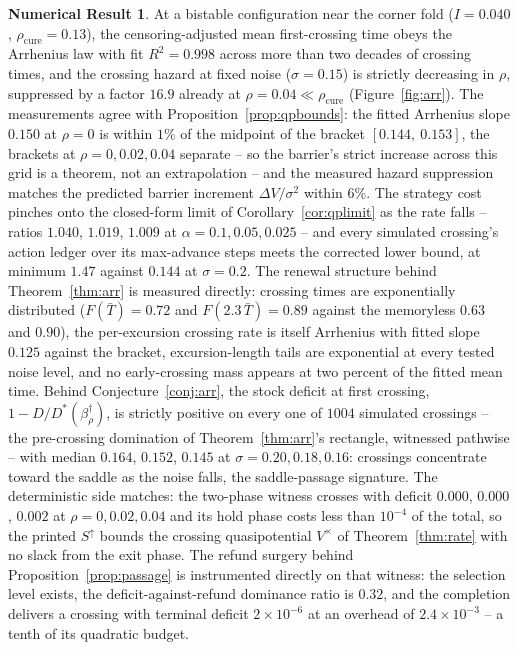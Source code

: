 \documentclass[11pt]{article}
\theoremstyle{definition}
\newtheorem{numresult}[theorem]{Numerical Result}
\theoremstyle{remark}
\numberwithin{equation}{section}
\begin{document}
\begin{numresult}\label{nr:arr}
At a bistable configuration near the corner fold ($I = 0.040$, $\rho_{\mathrm{cure}} = 0.13$), the censoring-adjusted mean first-crossing time obeys the Arrhenius law with fit $R^2 = 0.998$ across more than two decades of crossing times, and the crossing hazard at fixed noise ($\sigma = 0.15$) is strictly decreasing in $\rho$, suppressed by a factor $16.9$ already at $\rho = 0.04 \ll \rho_{\mathrm{cure}}$ (Figure~\ref{fig:arr}). The measurements agree with Proposition~\ref{prop:qpbounds}: the fitted Arrhenius slope $0.150$ at $\rho = 0$ is within $1\%$ of the midpoint of the bracket $[0.144,\ 0.153]$, the brackets at $\rho = 0, 0.02, 0.04$ separate -- so the barrier's strict increase across this grid is a theorem, not an extrapolation -- and the measured hazard suppression matches the predicted barrier increment $\Delta V/\sigma^2$ within $6\%$. The strategy cost pinches onto the closed-form limit of Corollary~\ref{cor:qplimit} as the rate falls -- ratios $1.040$, $1.019$, $1.009$ at $\alpha = 0.1, 0.05, 0.025$ -- and every simulated crossing's action ledger over its max-advance steps meets the corrected lower bound, at minimum $1.47$ against $0.144$ at $\sigma = 0.2$. The renewal structure behind Theorem~\ref{thm:arr} is measured directly: crossing times are exponentially distributed ($F(\bar T) = 0.72$ and $F(2.3\,\bar T) = 0.89$ against the memoryless $0.63$ and $0.90$), the per-excursion crossing rate is itself Arrhenius with fitted slope $0.125$ against the bracket, excursion-length tails are exponential at every tested noise level, and no early-crossing mass appears at two percent of the fitted mean time. Behind Conjecture~\ref{conj:arr}, the stock deficit at first crossing, $1 - D/D^\ast(\beta^\dagger_\rho)$, is strictly positive on every one of $1004$ simulated crossings -- the pre-crossing domination of Theorem~\ref{thm:arr}'s rectangle, witnessed pathwise -- with median $0.164$, $0.152$, $0.145$ at $\sigma = 0.20, 0.18, 0.16$: crossings concentrate toward the saddle as the noise falls, the saddle-passage signature. The deterministic side matches: the two-phase witness crosses with deficit $0.000$, $0.000$, $0.002$ at $\rho = 0, 0.02, 0.04$ and its hold phase costs less than $10^{-4}$ of the total, so the printed $S^{\uparrow}$ bounds the crossing quasipotential $V^{\times}$ of Theorem~\ref{thm:rate} with no slack from the exit phase. The refund surgery behind Proposition~\ref{prop:passage} is instrumented directly on that witness: the selection level exists, the deficit-against-refund dominance ratio is $0.32$, and the completion delivers a crossing with terminal deficit $2\times10^{-6}$ at an overhead of $2.4\times10^{-3}$ -- a tenth of its quadratic budget.


\end{numresult}
\end{document}
